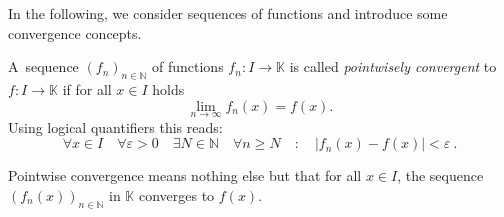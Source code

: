 

In the following, we consider sequences of functions and introduce some convergence concepts.

\begin{Definition}
A~sequence $(f_n)_{n\in\mathbb{N}}$ of functions $f_n:I\to\mathbb{K}$ is called \emph{pointwisely convergent} to $f:I\to\mathbb{K}$ if for all $x\in I$ holds
\[\lim_{n\to\infty}f_n(x)=f(x).\]
Using logical quantifiers this reads:
\begin{equation}\label{def:lptwconv}
	\forall x\in I
		\quad \forall \varepsilon > 0 
	\quad \exists N \in \mathbb{N}
	\quad \forall n \geq N
	\quad : \quad
	|f_n(x)-f(x)|<\varepsilon \ .
\end{equation}
\end{Definition}
Pointwise convergence means nothing else but that for all $x\in I$, the sequence $(f_n(x))_{n\in\mathbb{N}}$ in $\mathbb{K}$ converges to $f(x)$. 

